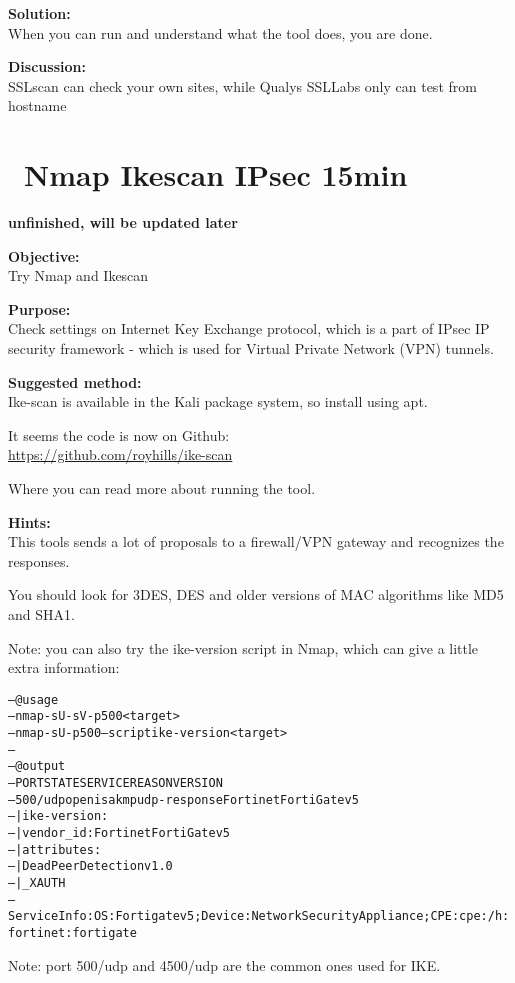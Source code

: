 \documentclass[a4paper,11pt,notitlepage]{report}
\begin{document}
{\bf Solution:}\\
When you can run and understand what the tool does, you are done.

{\bf Discussion:}\\
SSLscan can check your own sites, while Qualys SSLLabs only can test from hostname



\chapter{\faInfoCircle\ Nmap Ikescan IPsec 15min}
\label{ex:nmap-ikescan}

{\bf unfinished, will be updated later}

{\bf Objective:}\\
Try Nmap and Ikescan

{\bf Purpose:}\\
Check settings on Internet Key Exchange protocol, which is a part of IPsec IP security framework - which is used for Virtual Private Network (VPN) tunnels.

{\bf Suggested method:}\\
Ike-scan is available in the Kali package system, so install using apt.

It seems the code is now on Github:\\
\url{https://github.com/royhills/ike-scan}

Where you can read more about running the tool.

{\bf Hints:}\\
This tools sends a lot of proposals to a firewall/VPN gateway and recognizes the responses.

You should look for 3DES, DES and older versions of MAC algorithms like MD5 and SHA1.

Note: you can also try the ike-version script in Nmap, which can give a little extra information:
\begin{alltt}
-- @usage
-- nmap -sU -sV -p 500 <target>
-- nmap -sU -p 500 --script ike-version <target>
--
-- @output
-- PORT    STATE SERVICE REASON       VERSION
-- 500/udp open  isakmp  udp-response Fortinet FortiGate v5
-- | ike-version:
-- |   vendor_id: Fortinet FortiGate v5
-- |   attributes:
-- |     Dead Peer Detection v1.0
-- |_    XAUTH
-- Service Info: OS: Fortigate v5; Device: Network Security Appliance; CPE: cpe:/h:fortinet:fortigate
\end{alltt}

Note: port 500/udp and 4500/udp are the common ones used for IKE.
\end{document}
